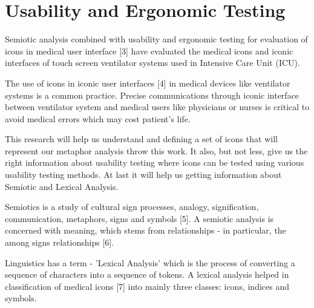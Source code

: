 \section{Usability and Ergonomic Testing}

Semiotic analysis combined with usability and ergonomic testing for evaluation of icons in medical user interface [3] have evaluated the medical icons and iconic interfaces of touch screen ventilator systems used in Intensive Care Unit (ICU).

The use of icons in iconic user interfaces [4] in medical devices like ventilator systems is a common practice. Precise communications through iconic interface between ventilator system and medical users like physicians or nurses is critical to avoid medical errors which may cost patient's life.

This research will help us understand and defining a set of icons that will represent our metaphor analysis throw this work. It also, but not less, give us the right information about usability testing where icons can be tested using various usability testing methods. At last it will help us getting information about Semiotic and Lexical Analysis.

Semiotics is a study of cultural sign processes, analogy, signification, communication, metaphors, signs and symbols [5]. A semiotic analysis is concerned with meaning, which stems from relationships - in particular, the among signs relationships [6].

Linguistics has a term - 'Lexical Analysis' which is the process of converting a sequence of characters into a sequence of tokens. A lexical analysis helped in classification of medical icons [7] into mainly three classes: icons, indices and symbols.